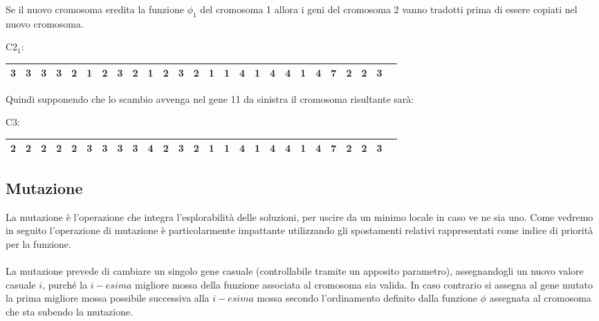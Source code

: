 \documentclass{article}
\begin{document}
Se il nuovo cromosoma eredita la funzione $\phi_1$ del cromosoma 1 allora i geni del cromosoma 2 vanno tradotti prima di essere copiati nel nuovo cromosoma.
\begin{center}
\begin{adjustbox}{width=\columnwidth,center}
   C$2_1$: \begin{tabular}{ | c | c | c | c | c | c | c | c| c | c | c | c | c | c | c | c| c | c | c | c | c | c | c | c | c | c | } 
  \hline
   3 & 3 & 3 & 3 & 2 & 1 & 2 & 3 & 2 & 1 & 2 & 3 & 2 & 1 & 1 & 4 & 1 & 4 & 4 & 1 & 4 & 7 & 2 & 2 & 3 \\
  \hline
\end{tabular}
\end{adjustbox}
\end{center}
Quindi supponendo che lo scambio avvenga nel gene 11 da sinistra il cromosoma risultante sarà:
\begin{center}
\begin{adjustbox}{width=\columnwidth,center}
   C3: \begin{tabular}{ | c | c | c | c | c | c | c | c| c | c | c | c | c | c | c | c| c | c | c | c | c | c | c | c | c | c | } 
  \hline
   2 & 2 & 2 & 2 & 2 & 3 & 3 &3&3&4 & 2 & 3 & 2 & 1 & 1 & 4 & 1 & 4 & 4 & 1 & 4 & 7 & 2 & 2 & 3 \\
  \hline
\end{tabular}
\end{adjustbox}
\end{center}

\subsection{Mutazione}
La mutazione è l'operazione che integra l'esplorabilità delle soluzioni, per uscire da un minimo locale in caso ve ne sia uno.
Come vedremo in seguito l'operazione di mutazione è particolarmente impattante utilizzando gli spostamenti relativi rappresentati come indice di priorità per la funzione.

\paragraph{}
La mutazione prevede di cambiare un singolo gene casuale (controllabile tramite un apposito parametro), assegnandogli un nuovo valore casuale $i$, purché la $i-esima$ migliore mossa della funzione associata al cromosoma sia valida. In caso contrario si assegna al gene mutato la prima migliore mossa possibile successiva alla $i-esima$ mossa secondo l'ordinamento definito dalla funzione $\phi$ assegnata al cromosoma che sta subendo la mutazione.
\end{document}
